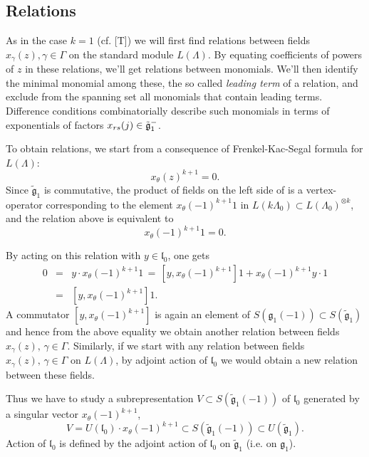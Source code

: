 \documentclass[a4paper, 10pt,oneside]{amsart}
\begin{document}
\subsection{Relations}

As in the case $k=1$ (cf. [T]) we will first find relations between
fields $x_\gamma(z), \gamma\in\Gamma$ on the standard module
$L(\Lambda)$. By equating coefficients of powers of $z$ in these
relations, we'll get relations between monomials. We'll then
identify the minimal monomial among these, the so called {\it
leading term} of a relation, and exclude from the spanning set all
monomials that contain leading terms. Difference conditions
combinatorially describe such monomials in terms of exponentials of
factors $x_{rs}(\-j)\in {\tilde{{\mathfrak g}}}_1^-$.

To obtain relations, we start from a consequence of
Frenkel-Kac-Segal formula for $L(\Lambda)$:
$$x_\theta(z)^{k+1}=0.$$
Since ${\tilde{{\mathfrak g}}}_1$ is commutative, the product of fields on the left side of
is a vertex-operator corresponding to the element $x_\theta(-1)^{k+1}1$
in $L(k\Lambda_0)\subset L(\Lambda_0)^{\otimes k}$, and the relation above is equivalent to
 $$x_\theta(-1)^{k+1}1=0.$$

By acting on this relation with $y\in {{\mathfrak l}}_0$, one gets 
\begin{eqnarray} 0 & = & y\cdot
x_\theta(-1)^{k+1}1\,=\,[y,x_\theta(-1)^{k+1}]1 +
x_\theta(-1)^{k+1}y\cdot 1 \label{erel5_jed}\\
& = &[y,x_\theta(-1)^{k+1}]1\nonumber.
\end{eqnarray}
 A commutator $[y,x_\theta(-1)^{k+1}]$ is again an element of
 $S({{\mathfrak g}}_1(-1))\subset S({\tilde{{\mathfrak g}}}_1)$ and hence from the above equality
 we obtain another relation between fields $x_\gamma(z),\,
 \gamma\in\Gamma$.
Similarly, if we start with any relation between fields
$x_\gamma(z),\,\gamma\in\Gamma$ on $L(\Lambda)$, by adjoint action
of ${{\mathfrak l}}_0$ we would obtain a new relation between these fields. 

Thus we have to study a subrepresentation $V\subset
S({\tilde{{\mathfrak g}}}_1(-1))$ of ${{\mathfrak l}}_0$ generated by a singular vector
$x_\theta(-1)^{k+1}$,
\begin{equation} \label{erel1_jed}
V=U({{\mathfrak l}}_0)\cdot x_\theta(-1)^{k+1}\subset S({\tilde{{\mathfrak g}}}_1(-1))\subset U({\tilde{{\mathfrak g}}}_1).
\end{equation}
Action of ${{\mathfrak l}}_0$ is defined by the adjoint action of ${{\mathfrak l}}_0$ on
${\tilde{{\mathfrak g}}}_1$ (i.e. on ${{\mathfrak g}}_1$).
\end{document}
